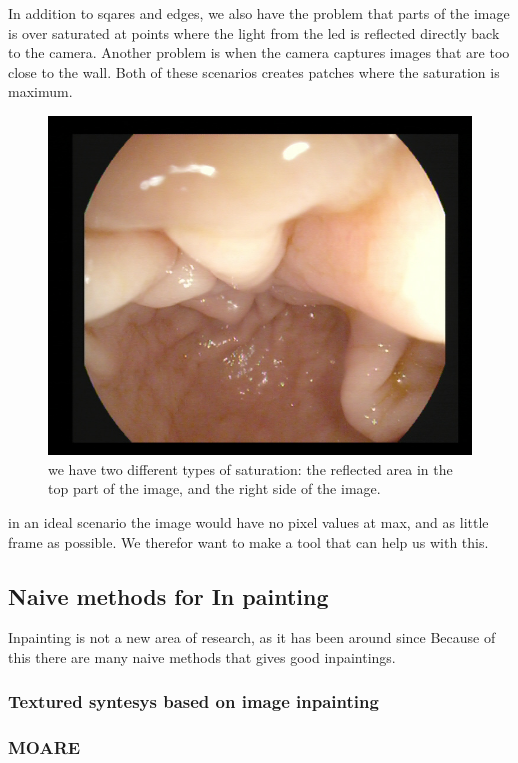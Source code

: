   In addition to sqares and edges, we also have the problem that parts of the image is over saturated at points where the light from the led is reflected directly back to the camera.
  Another problem is when the camera captures images that are too close to the wall. Both of these scenarios creates patches where the saturation is maximum. 
   \begin{figure}[ht]
    \centering
    \includegraphics[scale=0.5]{background/figures/reflection.jpg}
    \caption{we have two different types of saturation: the reflected area in the top part of the image, and the right side of the image.}
  \end{figure}
  in an ideal scenario the image would have no pixel values at max, and as little frame as possible. 
  We therefor want to make a tool that can help us with this.
  \subsection{Naive methods for In painting}
    Inpainting is not a new area of research, as it has been around since %
    Because of this there are many naive methods that gives good inpaintings. 
	
    \subsubsection{Textured syntesys based on image inpainting}
    \subsubsection{MOARE}
